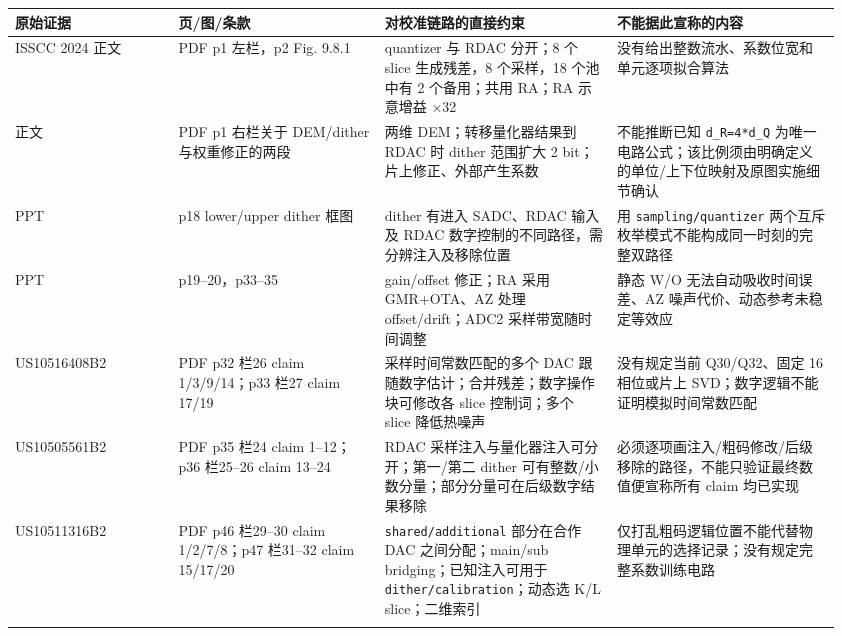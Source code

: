 \documentclass[UTF8,fontset=fandol,10pt,a4paper,openany]{ctexrep}
\newcommand{\code}[1]{\nolinkurl{#1}}
\begin{document}
\begingroup\small\setlength{\tabcolsep}{2pt}\renewcommand{\arraystretch}{1.25}\begin{longtable}{@{}>{\raggedright\arraybackslash}p{0.19\linewidth}>{\raggedright\arraybackslash}p{0.24\linewidth}>{\raggedright\arraybackslash}p{0.27\linewidth}>{\raggedright\arraybackslash}p{0.26\linewidth}@{}}
\toprule
\textbf{原始证据} & \textbf{页/图/条款} & \textbf{对校准链路的直接约束} & \textbf{不能据此宣称的内容}\\\midrule\endhead
[00] ISSCC 2024 正文 & PDF p1 左栏，p2 Fig. 9.8.1 & quantizer 与 RDAC 分开；8 个 slice 生成残差，8 个采样，18 个池中有 2 个备用；共用 RA；RA 示意增益 \ensuremath{\times}32 & 没有给出整数流水、系数位宽和单元逐项拟合算法\\\addlinespace[2pt]
[00] 正文 & PDF p1 右栏关于 DEM/dither 与权重修正的两段 & 两维 DEM；转移量化器结果到 RDAC 时 dither 范围扩大 2 bit；片上修正、外部产生系数 & 不能推断已知 \code{d_R=4*d_Q} 为唯一电路公式；该比例须由明确定义的单位/上下位映射及原图实施细节确认\\\addlinespace[2pt]
[00\_1] PPT & p18 lower/upper dither 框图 & dither 有进入 SADC、RDAC 输入及 RDAC 数字控制的不同路径，需分辨注入及移除位置 & 用 \code{sampling/quantizer} 两个互斥枚举模式不能构成同一时刻的完整双路径\\\addlinespace[2pt]
[00\_1] PPT & p19–20，p33–35 & gain/offset 修正；RA 采用 GMR+OTA、AZ 处理 offset/drift；ADC2 采样带宽随时间调整 & 静态 W/O 无法自动吸收时间误差、AZ 噪声代价、动态参考未稳定等效应\\\addlinespace[2pt]
[09] US10516408B2 & PDF p32 栏26 claim 1/3/9/14；p33 栏27 claim 17/19 & 采样时间常数匹配的多个 DAC 跟随数字估计；合并残差；数字操作块可修改各 slice 控制词；多个 slice 降低热噪声 & 没有规定当前 Q30/Q32、固定 16 相位或片上 SVD；数字逻辑不能证明模拟时间常数匹配\\\addlinespace[2pt]
[10] US10505561B2 & PDF p35 栏24 claim 1–12；p36 栏25–26 claim 13–24 & RDAC 采样注入与量化器注入可分开；第一/第二 dither 可有整数/小数分量；部分分量可在后级数字结果移除 & 必须逐项画注入/粗码修改/后级移除的路径，不能只验证最终数值便宣称所有 claim 均已实现\\\addlinespace[2pt]
[11] US10511316B2 & PDF p46 栏29–30 claim 1/2/7/8；p47 栏31–32 claim 15/17/20 & \code{shared/additional} 部分在合作 DAC 之间分配；main/sub bridging；已知注入可用于 \code{dither/calibration}；动态选 K/L slice；二维索引 & 仅打乱粗码逻辑位置不能代替物理单元的选择记录；没有规定完整系数训练电路\\\addlinespace[2pt]
\bottomrule\end{longtable}\endgroup
\end{document}
